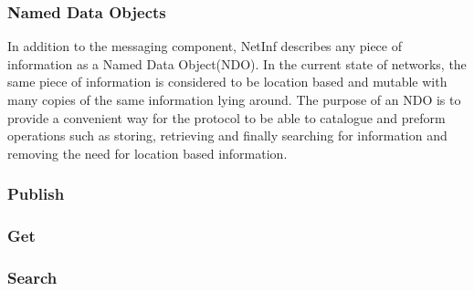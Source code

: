 \subsubsection{Named Data Objects}
In addition to the messaging component, NetInf describes any piece of information as a Named Data Object(NDO). In the current state of networks, the same piece of information is considered to be location based and mutable with many copies of the same information lying around. The purpose of an NDO is to provide a convenient way for the protocol to be able to catalogue and preform operations such as storing, retrieving and finally searching for information and removing the need for location based information.


\subsubsection{Publish}




\subsubsection{Get}

\subsubsection{Search}


